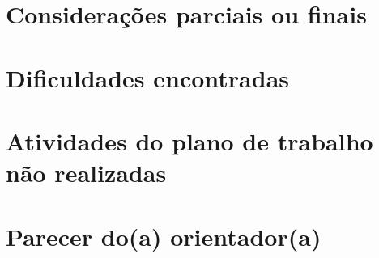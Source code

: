 \documentclass[monografia]{ufape}
\begin{document}
\chapter{Considerações parciais ou finais}


\chapter{Dificuldades encontradas}


\begin{referencias}
  
\end{referencias}

\setcounter{chapter}{8}

\chapter{Atividades do plano de trabalho não realizadas}


\chapter{Parecer do(a) orientador(a)}

\end{document}
